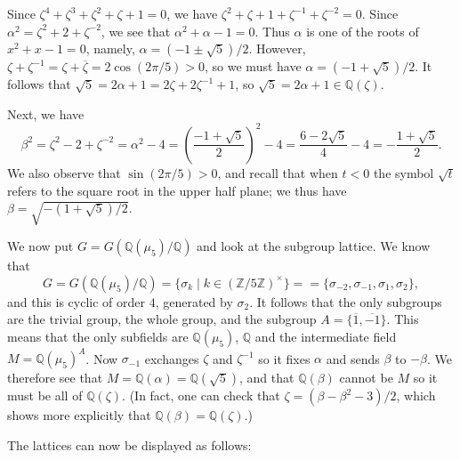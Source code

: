 \documentclass{amsart}
\newcommand{\Z}         {{\mathbb{Z}}}
\newcommand{\Q}         {{\mathbb{Q}}}
\newcommand{\al}        {\alpha}
\newcommand{\bt}        {\beta}
\newcommand{\zt}        {\zeta}
\newcommand{\sg}        {\sigma}
\newcommand{\ov}[1]     {\overline{#1}}
\newcommand{\st}        {\;|\;}
\newcommand{\tm}        {\times}
\renewcommand{\:}{\colon}
\newenvironment{solution}{\SolutionInline}{\endSolutionInline}
\theoremstyle{definition}
\renewenvironment{solution}{\SolutionAtEnd}{\endSolutionAtEnd}
\begin{document}
\begin{solution}
 Since $\zt^4+\zt^3+\zt^2+\zt+1=0$, we have
 $\zt^2+\zt+1+\zt^{-1}+\zt^{-2}=0$. Since $\al^2=\zt^2+2+\zt^{-2}$, we
 see that $\al^2+\al-1=0$.  Thus $\al$ is one of the roots of
 $x^2+x-1=0$, namely, $\al=(-1\pm\sqrt{5})/2$.  However,
 $\zt+\zt^{-1}=\zt+\ov{\zt}=2\cos(2\pi/5)>0$, so we must have
 $\al=(-1+\sqrt{5})/2$.  It follows that
 $\sqrt{5}=2\al+1=2\zt+2\zt^{-1}+1$, so $\sqrt{5}=2\al+1\in\Q(\zt)$.

 Next, we have 
 \[ \bt^2=\zt^2-2+\zt^{-2}=\al^2-4=
     \left(\frac{-1+\sqrt{5}}{2}\right)^2 - 4 = 
     \frac{6-2\sqrt{5}}{4}-4 = - \frac{1+\sqrt{5}}{2}.
 \]
 We also observe that $\sin(2\pi/5)>0$, and recall that when $t<0$ the
 symbol $\sqrt{t}$ refers to the square root in the upper half plane;
 we thus have $\bt=\sqrt{-(1+\sqrt{5})/2}$.

 We now put $G=G(\Q(\mu_5)/\Q)$ and look at the subgroup lattice.
 We know that
 \[ G = G(\Q(\mu_5)/\Q)=\{\sg_k\st k\in (\Z/5\Z)^\tm\} = 
     = \{\sg_{-2},\sg_{-1},\sg_{1},\sg_{2}\},
 \]
 and this is cyclic of order $4$, generated by $\sg_{2}$.  It follows
 that the only subgroups are the trivial group, the whole group, and
 the subgroup $A=\{\ov{1},\ov{-1}\}$.  This means that the only
 subfields are $\Q(\mu_5)$, $\Q$ and the intermediate field
 $M=\Q(\mu_5)^A$.  Now $\sg_{-1}$ exchanges $\zt$ and $\zt^{-1}$ so it
 fixes $\al$ and sends $\bt$ to $-\bt$.  We therefore see that
 $M=\Q(\al)=\Q(\sqrt{5})$, and that $\Q(\bt)$ cannot be $M$ so it must
 be all of $\Q(\zt)$.  (In fact, one can check that
 $\zt=(\bt-\bt^2-3)/2$, which shows more explicitly that
 $\Q(\bt)=\Q(\zt)$.) 

 The lattices can now be displayed as follows:
 \begin{center}
 \end{center}
\end{solution}
\end{document}

